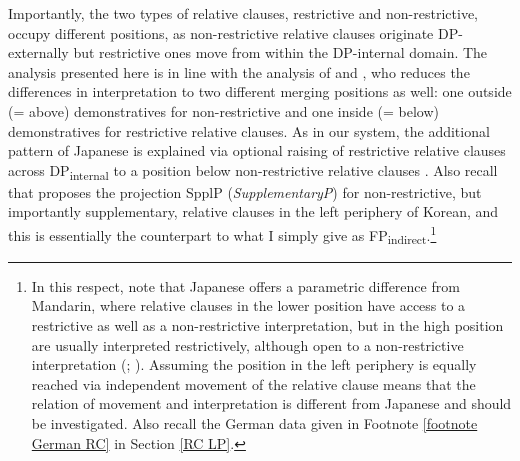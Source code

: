 Importantly, the two types of relative clauses, restrictive and non-restrictive, occupy different positions, as non-restrictive relative clauses originate DP-externally but restrictive ones move from within the DP-internal domain. The analysis presented here is in line with the analysis of \citet[223]{cinque:2020:relcl} and \citet{cinque:2008:two}, who reduces the differences in interpretation to two different merging positions as well: one outside (= above) demonstratives for non-restrictive and one inside (= below) demonstratives for restrictive relative clauses. As in our system, the additional pattern of Japanese is explained via optional raising of restrictive relative clauses across DP\textsubscript{internal} to a position below non-restrictive relative clauses \citep[116]{cinque:2008:two}. Also recall that \citet{kim:2019:syntax} proposes the projection SpplP (\textit{SupplementaryP}) for non-restrictive, but importantly supplementary, relative clauses in the left periphery of Korean, and this is essentially the counterpart to what I simply give as FP\textsubscript{indirect}.\footnote{In this respect, note that Japanese offers a parametric difference from Mandarin, where relative clauses in the lower position have access to a restrictive as well as a non-restrictive interpretation, but in the high position are usually interpreted restrictively, although open to a non-restrictive interpretation (\citealt[235–236]{cinque:2020:relcl}; \citealt{hsu:2017:alternatives}). Assuming the position in the left periphery is equally reached via independent movement of the relative clause means that the relation of movement and interpretation is different from Japanese and should be investigated. Also recall the German data given in Footnote \ref{footnote German RC} in Section \ref{RC LP}.}


\newpage

